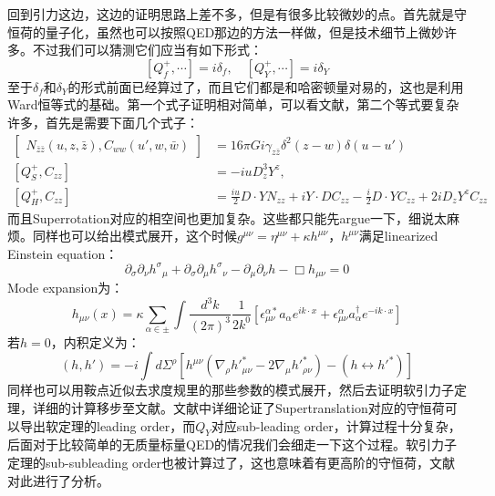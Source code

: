 回到引力这边，这边的证明思路上差不多，但是有很多比较微妙的点。首先就是守恒荷的量子化，虽然也可以按照QED那边的方法一样做，但是技术细节上微妙许多。不过我们可以猜测它们应当有如下形式：
\begin{equation}
	\boxed{
		\left[Q_f^+,\cdots\right]=i\delta_f,\quad \left[Q_Y^+,\cdots\right]=i\delta_Y
	}
\end{equation}
至于$\delta_f$和$\delta_Y$的形式前面已经算过了，而且它们都是和哈密顿量对易的，这也是利用Ward恒等式的基础。第一个式子证明相对简单，可以看文献\cite{He:2014laa}，第二个等式要复杂许多，首先是需要下面几个式子\cite{Ashtekar1987AsymptoticQ,Ashtekar:1978zz,Ashtekar:1981bq,PhysRevLett.46.573}：
\begin{equation}
	\begin{aligned}
		\begin{bmatrix}N_{\bar{z}\bar{z}}(u,z,\bar{z}),C_{ww}(u',w,\bar{w})\end{bmatrix}&=16\pi Gi\gamma_{z\bar{z}}\delta^2(z-w)\delta(u-u')\\
		\left[Q_{S}^{+},C_{zz}\right]&=-iuD_{z}^{3}Y^{z},\\\left[Q_{H}^{+},C_{zz}\right]&=\frac{iu}{2}D\cdot YN_{zz}+iY\cdot DC_{zz}-\frac{i}{2}D\cdot YC_{zz}+2iD_{z}Y^{z}C_{zz}
	\end{aligned}
\end{equation}
而且Superrotation对应的相空间也更加复杂\cite{Strominger:2016wns}。这些都只能先argue一下，细说太麻烦。同样也可以给出模式展开，这个时候$g^{\mu\nu}=\eta^{\mu\nu}+\kappa h^{\mu\nu}$，$h^{\mu\nu}$满足linearized Einstein equation：
\begin{equation}
	\partial_{\sigma}\partial_{\nu}h^{\sigma}{}_{\mu}+\partial_{\sigma}\partial_{\mu}h^{\sigma}{}_{\nu}-\partial_{\mu}\partial_{\nu}h-\Box h_{\mu\nu}=0
\end{equation}
Mode expansion为：
\begin{equation}
	{h}_{\mu\nu}(x)=\kappa\sum_{\alpha\in\pm}\int\frac{d^3k}{(2\pi)^3}\frac{1}{2k^0}\left[\epsilon_{\mu\nu}^{\alpha*}a_{\alpha}e^{ik\cdot x}+\epsilon_{\mu\nu}^{\alpha}a_{\alpha}^{\dagger}e^{-ik\cdot x}\right]
\end{equation}
若$h=0$，内积定义为：
\begin{equation}
	(h,h')=-i\int d\Sigma^\rho[h^{\mu\nu}(\nabla_\rho {h'}_{\mu\nu}^*-2\nabla_\mu {h'}_{\rho\nu}^*)-(h\leftrightarrow {h'}^*)]
\end{equation}
同样也可以用鞍点近似去求度规里的那些参数的模式展开，然后去证明软引力子定理，详细的计算移步至文献\cite{Kapec:2014opa,He:2014laa,Campiglia:2014yka}。文献中详细论证了Supertranslation对应的守恒荷可以导出软定理的leading order，而$Q_Y$对应sub-leading order，计算过程十分复杂，后面对于比较简单的无质量标量QED的情况我们会细走一下这个过程。软引力子定理的sub-subleading order也被计算过了\cite{Cachazo:2014fwa}，这也意味着有更高阶的守恒荷，文献\cite{Campiglia:2016efb}对此进行了分析。

